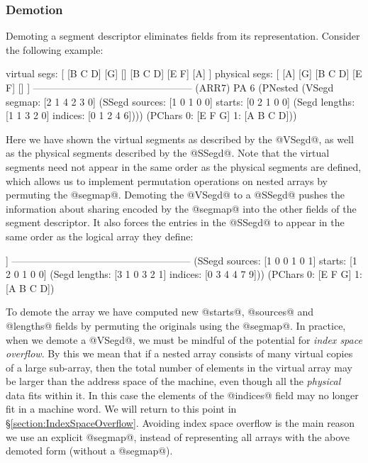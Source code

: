 \subsubsection{Demotion}
\label{section:Demotion}
Demoting a segment descriptor eliminates fields from its representation. Consider the following example:
\par
\begin{small}
\begin{code}
  virtual segs: [ [B C D] [G] [] [B C D] [E F] [A] ]
 physical segs: [ [A] [G] [B C D] [E F] [] ]
 ------------------------------------------------ (ARR7)
 PA 6 (PNested 
  (VSegd  segmap: [2 1 4 2 3 0]
  (SSegd sources: [1 0 1 0 0] starts:  [0 2 1 0 0]
  (Segd  lengths: [1 1 3 2 0] indices: [0 1 2 4 6])))
  (PChars 0: [E F G] 1: [A B C D]))
\end{code}
\end{small}
\par
Here we have shown the virtual segments as described by the @VSegd@, as well as the physical segments described by the @SSegd@. Note that the virtual segments need not appear in the same order as the physical segments are defined, which allows us to implement permutation operations on nested arrays by permuting the @segmap@. Demoting the @VSegd@ to a @SSegd@ pushes the information about sharing encoded by the @segmap@ into the other fields of the segment descriptor. It also forces the entries in the @SSegd@ to appear in the same order as the logical array they define:
\par
\begin{small}
\begin{code}
         [ [B C D] [G] [] [B C D] [E F] [A] ]
 ------------------------------------------------------
  (SSegd sources: [1 0 0 1 0 1]  starts: [1 2 0 1 0 0]
  (Segd  lengths: [3 1 0 3 2 1] indices: [0 3 4 4 7 9]))
  (PChars 0: [E F G] 1: [A B C D])
\end{code}
\end{small}
\par
To demote the array we have computed new @starts@, @sources@ and @lengths@ fields by permuting the originals using the @segmap@. In practice, when we demote a @VSegd@, we must be mindful of the potential for \emph{index space overflow}. By this we mean that if a nested array consists of many virtual copies of a large sub-array, then the total number of elements in the virtual array may be larger than the address space of the machine, even though all the \emph{physical} data fits within it. In this case the elements of the @indices@ field may no longer fit in a machine word. We will return to this point in \S\ref{section:IndexSpaceOverflow}. Avoiding index space overflow is the main reason we use an explicit @segmap@, instead of representing all arrays with the above demoted form (without a @segmap@).

